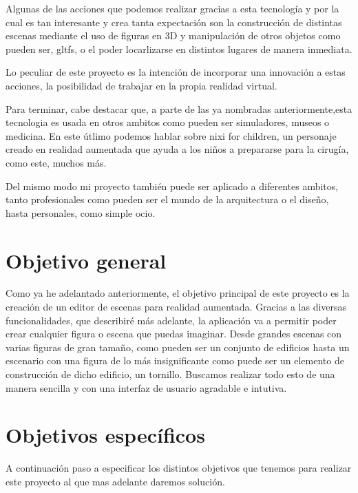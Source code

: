 \documentclass[a4paper, 12pt]{book}
\begin{document}
Algunas de las acciones que podemos realizar gracias a esta tecnología y por la cual es tan interesante y crea tanta expectación son la construcción de distintas escenas mediante el uso de figuras en 3D y  manipulación de otros objetos como pueden ser, gltfs, o el poder locarlizarse en distintos lugares de manera inmediata.

Lo peculiar de este proyecto es la intención de incorporar una innovación a estas acciones, la posibilidad de trabajar en la propia realidad virtual.

Para terminar, cabe destacar que, a parte de las ya nombradas anteriormente,esta tecnologia es usada en otros ambitos como pueden ser simuladores, museos o medicina. En este útlimo podemos hablar sobre nixi for children, un personaje creado en realidad aumentada que ayuda a los niños a prepararse para la cirugía, como este, muchos más.

Del mismo modo mi proyecto también puede ser aplicado a diferentes ambitos, tanto profesionales como pueden ser el mundo de la arquitectura o el diseño, hasta personales, como simple ocio.

\section{Objetivo general}
\label{sec:objetivo general}

Como ya he adelantado anteriormente, el objetivo principal de este proyecto es la creación de un editor de escenas para realidad aumentada. Gracias a las diversas funcionalidades, que describiré más adelante, la aplicación va a permitir poder crear cualquier figura o escena que puedas imaginar. Desde grandes escenas con varias figuras de gran tamaño, como pueden ser un conjunto de edificios hasta un escenario con una figura de lo más insignificante como puede ser un elemento de construcción de dicho edificio, un tornillo. Buscamos realizar todo esto de una manera sencilla y con una interfaz de usuario agradable e intutiva.

\section{Objetivos específicos}
\label{sec:Objetivos específicos}

A continuación paso a especificar los distintos objetivos que tenemos para realizar este proyecto al que mas adelante daremos solución. 
\end{document}
